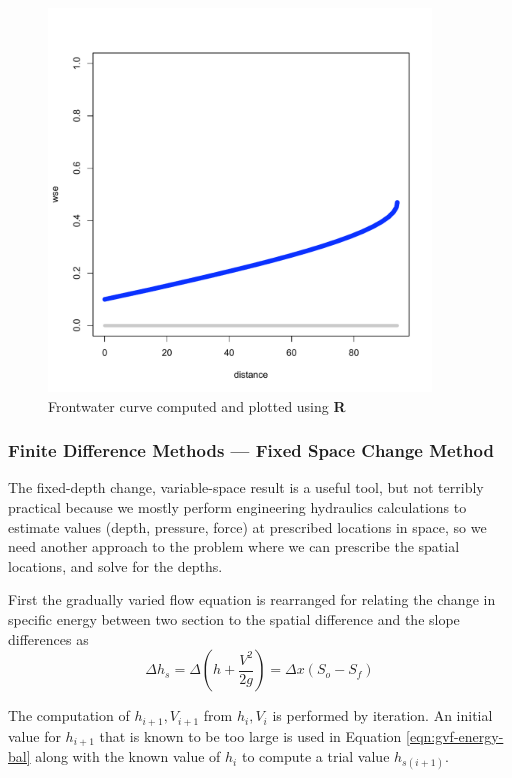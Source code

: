 \begin{figure}[h!] %
   \centering
   \includegraphics[width=4in]{./13-SteadyWSP/Example2Rplot.pdf} 
   \caption{Frontwater curve computed and plotted using \textbf{R}}
   \label{fig:Rplot2}
\end{figure}
\newpage
\subsubsection{Finite Difference Methods --- Fixed Space Change Method}
The fixed-depth change, variable-space result is a useful tool, but not terribly practical because we mostly perform engineering hydraulics calculations to estimate values (depth, pressure, force) at prescribed locations in space, so we need another approach to the problem where we can prescribe the spatial locations, and solve for the depths.

First the gradually varied flow equation is rearranged for relating the change in specific energy between two section to the spatial difference and the slope differences as
\begin{equation}
\Delta h_s = \Delta (h + \frac{V^2}{2g}) = \Delta x (S_o - S_f)
\label{eqn:gvf-energy-bal}
\end{equation}

The computation of $h_{i+1},V_{i+1}$ from $h_i,V_i$ is performed by iteration.
An initial value for $h_{i+1}$ that is known to be too large is used in Equation \ref{eqn:gvf-energy-bal} along with the known value of $h_i$ to compute a trial value $h_{s(i+1)}$.

